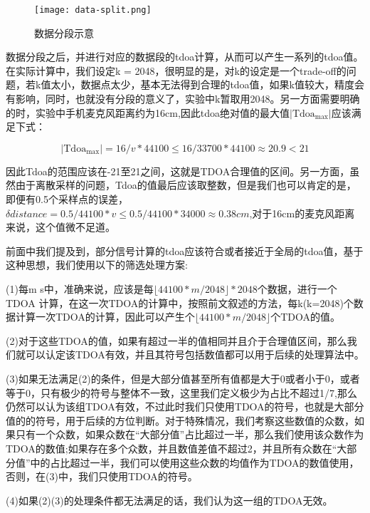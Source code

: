 \documentclass[winfonts]{njuthesis}
\begin{document}
		\begin{figure}[H]
			\centering
			\texttt{[image: data-split.png]} 
			\caption{{数据分段示意}}
			\label{fig: data-split}
		\end{figure}
		
		数据分段之后，并进行对应的数据段的tdoa计算，从而可以产生一系列的tdoa值。在实际计算中，我们设定k = 2048，很明显的是，对k的设定是一个trade-off的问题，若k值太小，数据点太少，基本无法得到合理的tdoa值，如果k值较大，精度会有影响，同时，也就没有分段的意义了，实验中k暂取用2048。另一方面需要明确的时，实验中手机麦克风距离约为16cm,因此tdoa绝对值的最大值$|\text{Tdoa}_{\text{max}}|$应该满足下式：
		
		\begin{equation}
			|\text{Tdoa}_{\text{max}}| = 16 / v * 44100 \leq 16 / 33700 * 44100  \approx 20.9 < 21
		\end{equation}
		
		因此Tdoa的范围应该在-21至21之间，这就是TDOA合理值的区间。另一方面，虽然由于离散采样的问题，Tdoa的值最后应该取整数，但是我们也可以肯定的是，即便有0.5个采样点的误差，$\delta distance = 0.5 / 44100 * v \leq 0.5 / 44100 * 34000 \approx 0.38cm$,对于16cm的麦克风距离来说，这个值微不足道。
		
		前面中我们提及到，部分信号计算的tdoa应该符合或者接近于全局的tdoa值，基于这种思想，我们使用以下的筛选处理方案:
		
		(1)每m s中，准确来说，应该是每$\lfloor 44100 * m / 2048 \rfloor * 2048 $个数据，进行一个TDOA 计算，在这一次TDOA的计算中，按照前文叙述的方法，每k(k=2048)个数据计算一次TDOA的计算，因此可以产生个$\lfloor 44100 * m / 2048 \rfloor$个TDOA的值。
		
		(2)对于这些TDOA的值，如果有超过一半的值相同并且介于合理值区间，那么我们就可以认定该TDOA有效，并且其符号包括数值都可以用于后续的处理算法中。
		
		(3)如果无法满足(2)的条件，但是大部分值甚至所有值都是大于0或者小于0，或者等于0，只有极少的符号与整体不一致，这里我们定义极少为占比不超过1/7,那么仍然可以认为该组TDOA有效，不过此时我们只使用TDOA的符号，也就是大部分值的的符号，用于后续的方位判断。对于特殊情况，我们考察这些数值的众数，如果只有一个众数，如果众数在“大部分值”占比超过一半，那么我们使用该众数作为TDOA的数值;如果存在多个众数，并且数值差值不超过2，并且所有众数在“大部分值”中的占比超过一半，我们可以使用这些众数的均值作为TDOA的数值使用，否则，在(3)中，我们只使用TDOA的符号。
		
		(4)如果(2)(3)的处理条件都无法满足的话，我们认为这一组的TDOA无效。
		
\end{document}
